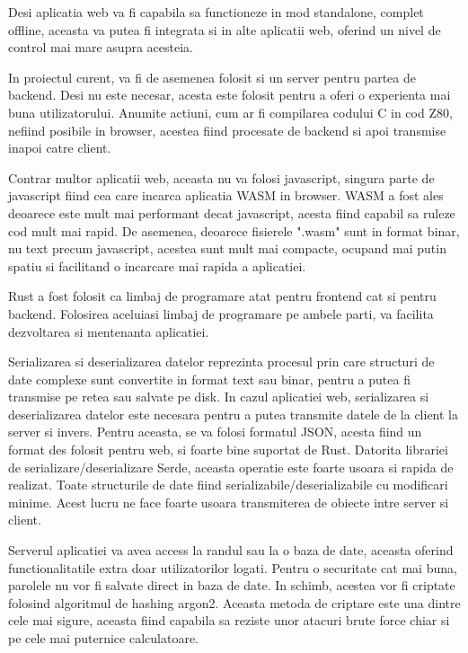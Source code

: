 \documentclass[titlepage,12pt]{article}
\begin{document}
Desi aplicatia web va fi capabila sa functioneze in mod standalone, complet offline, aceasta va putea fi integrata si in alte aplicatii web, oferind un nivel de control mai mare asupra acesteia.

In proiectul curent, va fi de asemenea folosit si un server pentru partea de backend. Desi nu este necesar, acesta este folosit pentru a oferi o experienta mai buna utilizatorului.
Anumite actiuni, cum ar fi compilarea codului C in cod Z80, nefiind posibile in browser, acestea fiind procesate de backend si apoi transmise inapoi catre client.

Contrar multor aplicatii web, aceasta nu va folosi javascript, singura parte de javascript fiind cea care incarca aplicatia \ac {WASM} in browser.
\ac {WASM} a fost ales deoarece este mult mai performant decat javascript, acesta fiind capabil sa ruleze cod mult mai rapid. De asemenea, deoarece fisierele ".wasm" sunt in format binar,
nu text precum javascript, acestea sunt mult mai compacte, ocupand mai putin spatiu si facilitand o incarcare mai rapida a aplicatiei.

\ac {Rust} a fost folosit ca limbaj de programare atat pentru frontend cat si pentru backend.
Folosirea aceluiasi limbaj de programare pe ambele parti, va facilita dezvoltarea si mentenanta aplicatiei.

Serializarea si deserializarea datelor reprezinta procesul prin care structuri de date complexe sunt convertite in format text sau binar, pentru a putea fi transmise pe retea sau salvate pe disk.
In cazul aplicatiei web, serializarea si deserializarea datelor este necesara pentru a putea transmite datele de la client la server si invers.
Pentru aceasta, se va folosi formatul JSON, acesta fiind un format des folosit pentru web, si foarte bine suportat de \ac {Rust}.
Datorita librariei de serializare/deserializare Serde, aceasta operatie este foarte usoara si rapida de realizat.
Toate structurile de date fiind serializabile/deserializabile cu modificari minime.
Acest lucru ne face foarte usoara transmiterea de obiecte intre server si client.

Serverul aplicatiei va avea access la randul sau la o baza de date, aceasta oferind functionalitatile extra doar utilizatorilor logati.
Pentru o securitate cat mai buna, parolele nu vor fi salvate direct in baza de date.
In schimb, acestea vor fi criptate folosind algoritmul de hashing argon2.
Aceasta metoda de criptare este una dintre cele mai sigure, aceasta fiind capabila sa reziste unor atacuri brute force chiar si pe cele mai puternice calculatoare.
\end{document}
